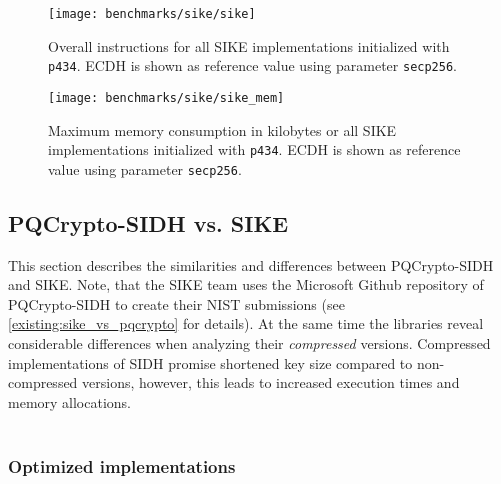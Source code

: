 \begin{figure}[H]
  \centering
  \texttt{[image: benchmarks/sike/sike]}
  \caption[Overall instructions \gls{SIKE}]
  {Overall instructions for all \gls{SIKE} implementations initialized with \texttt{p434}. \gls{ECDH} is shown as reference value using parameter \texttt{secp256}.}
  \label{fig:results_sike}
\end{figure}

\begin{figure}[H]
  \centering
  \texttt{[image: benchmarks/sike/sike\_mem]}
  \caption[Maximum memory consumption \gls{SIKE}]
  {Maximum memory consumption in kilobytes or all \gls{SIKE} implementations initialized with \texttt{p434}. \gls{ECDH} is shown as reference value using parameter \texttt{secp256}.}
  \label{fig:results_sike_mem}
\end{figure}

\subsection{\gls{PQCrypto-SIDH} vs. \gls{SIKE}}

This section describes the similarities and differences between \gls{PQCrypto-SIDH} and \gls{SIKE}. Note, that the \gls{SIKE} team uses the Microsoft Github repository of \gls{PQCrypto-SIDH} to create their \gls{NIST} submissions (see \autoref{existing:sike_vs_pqcrypto} for details). At the same time the libraries reveal considerable differences when analyzing their \textit{compressed} versions. Compressed implementations of \gls{SIDH} promise shortened key size compared to non-compressed versions, however, this leads to increased execution times and memory allocations. 
\\\\
\subsubsection{Optimized implementations}

